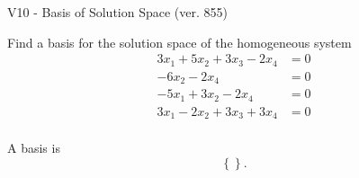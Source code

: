 \begin{exercise}
  \begin{exerciseTitle}V10 - Basis of Solution Space (ver. 855)\end{exerciseTitle}
  \begin{exerciseStatement}
    Find a basis for the solution space of the homogeneous system 
\begin{align*}
 3 x_ 1 + 5 x_ 2 + 3 x_ 3 -2 x_ 4 &= 0  \\ 
  -6 x_ 2 -2 x_ 4 &= 0  \\ 
  -5 x_ 1 + 3 x_ 2 -2 x_ 4 &= 0  \\ 
  3 x_ 1 -2 x_ 2 + 3 x_ 3 + 3 x_ 4 &= 0  \\ 
 \end{align*}


 
  \end{exerciseStatement}

  \begin{exerciseAnswer}
   A basis is   
\[\left\{\right\}.\]

  


  \end{exerciseAnswer}
\end{exercise}